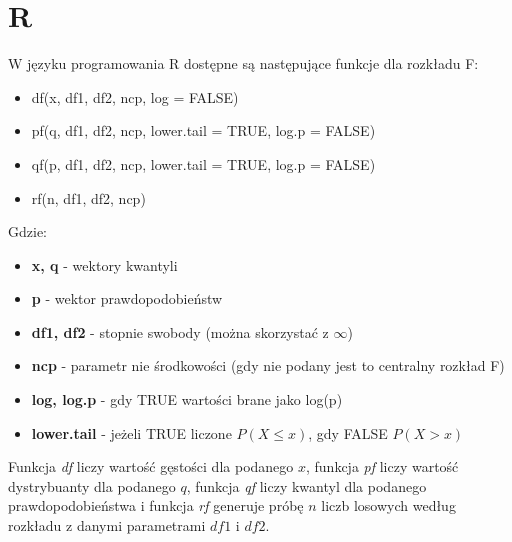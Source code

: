 \documentclass{article}
\begin{document}
\section{R}
W języku programowania R dostępne są następujące funkcje dla rozkładu F:
\begin{itemize}
\item df(x, df1, df2, ncp, log = FALSE)
\item pf(q, df1, df2, ncp, lower.tail = TRUE, log.p = FALSE)
\item qf(p, df1, df2, ncp, lower.tail = TRUE, log.p = FALSE)
\item rf(n, df1, df2, ncp)
\end{itemize}
Gdzie:
\begin{itemize}
\item \textbf{x, q} - wektory kwantyli
\item \textbf{p} - wektor prawdopodobieństw
\item \textbf{df1, df2} - stopnie swobody (można skorzystać z $\infty$)
\item \textbf{ncp} - parametr nie środkowości (gdy nie podany jest to centralny rozkład F)
\item \textbf{log, log.p} - gdy TRUE wartości brane jako log(p)
\item \textbf{lower.tail} - jeżeli TRUE liczone $P(X \leq x)$, gdy FALSE $P(X > x)$
\end{itemize} 
Funkcja \textit{df} liczy wartość gęstości dla podanego $x$, funkcja \textit{pf} liczy wartość dystrybuanty dla podanego $q$, funkcja \textit{qf} liczy kwantyl dla podanego prawdopodobieństwa i funkcja \textit{rf} generuje próbę $n$ liczb losowych według rozkładu z danymi parametrami $df1$ i $df2$.

\newpage
\end{document}
